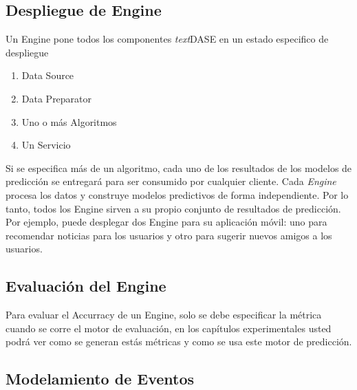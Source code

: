 \vspace{1cm}
\subsection{Despliegue de Engine}

  Un Engine pone todos los componentes \emph{text}{DASE} en un estado especifico de despliegue

  \begin{enumerate}
  		\setlength{\itemsep}{1pt}
  		\setlength{\parskip}{0pt}
  		\setlength{\parsep}{0pt}
    \item Data Source
    \item Data Preparator
    \item Uno o más Algoritmos
    \item Un Servicio
  \end{enumerate}

  Si se especifica más de un algoritmo, cada uno de los resultados de los modelos de predicción se entregará para ser consumido por cualquier cliente.
  Cada \emph{Engine} procesa los datos y construye modelos predictivos de forma independiente. Por lo tanto, todos los Engine sirven a su propio conjunto de resultados de predicción. Por ejemplo, puede desplegar dos Engine para su aplicación móvil: uno para recomendar noticias para los usuarios y otro para sugerir nuevos amigos a los usuarios.


\vspace{1cm}
\subsection{Evaluación del Engine }

  Para evaluar el Accurracy de un Engine, solo se debe especificar la métrica cuando se corre el motor de evaluación, en los capítulos experimentales usted podrá ver como se generan estás métricas y como se usa este motor de predicción.











\subsection{Modelamiento de Eventos}






